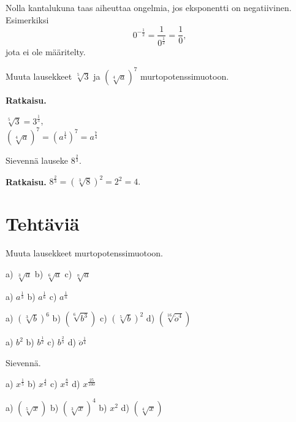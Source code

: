 Nolla kantalukuna taas aiheuttaa ongelmia, jos eksponentti on negatiivinen. Esimerkiksi
\[
 0^{-\tfrac{1}{2}}=\frac{1}{0^\frac{1}{2}}=\frac{1}{0}, %
\]
jota ei ole määritelty.

\begin{esimerkki}
Muuta lausekkeet $\sqrt[5]{3}$ ja $(\sqrt[4]{a})^7$ murtopotenssimuotoon.

{\bf Ratkaisu.}

$\sqrt[5]{3} = 3^\frac{1}{5}$, \\
$(\sqrt[4]{a})^7 = (a^\frac{1}{4})^7=a^\frac{7}{4}$
\end{esimerkki}

\begin{esimerkki}
Sievennä lauseke $8^\frac{2}{3}$.

{\bf Ratkaisu.}
 $8^\frac{2}{3} = (\sqrt[3]{8})^2 = 2^2 = 4.$
\end{esimerkki}

\section*{Tehtäviä}

Muuta lausekkeet murtopotenssimuotoon.

\begin{tehtava}
a) $\sqrt[3]{a}$ \qquad
b) $\sqrt[6]{a}$ \qquad
c) $\sqrt[n]{a}$ 
\begin{vastaus}	
a) $a^\frac{1}{3}$ \qquad
b) $a^\frac{1}{6}$ \qquad
c) $a^\frac{1}{n}$ \qquad
\end{vastaus}
\end{tehtava}

\begin{tehtava}
a) $(\sqrt[3]{b})^6$ \qquad
b) $(\sqrt[6]{b^3})$ \qquad
c) $(\sqrt[5]{b})^2$ \qquad
d) $(\sqrt[16]{\ddot{o}^4})$
\begin{vastaus}	
a) $b^2$ \qquad
b) $b^\frac{1}{2}$ \qquad
c) $b^\frac{2}{5}$ \qquad
d) $\ddot{o}^\frac{1}{4}$
\end{vastaus}
\end{tehtava}

Sievennä.
\begin{tehtava}
a) $x^\frac{1}{5}$ \qquad
b) $x^\frac{4}{3}$ \qquad
c) $x^\frac{8}{4}$ \qquad
d) $x^\frac{25}{100}$ \qquad
\begin{vastaus}	
a) $(\sqrt[5]{x})$ \qquad
b) $(\sqrt[3]{x})^4$ \qquad
b) $x^2$ \qquad
d) $(\sqrt[4]{x})$ 
\end{vastaus}
\end{tehtava}

